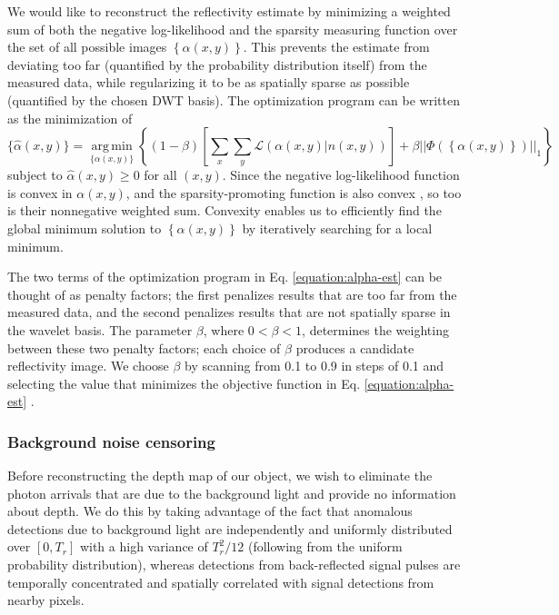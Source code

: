 We would like to reconstruct the reflectivity estimate by minimizing a weighted sum of both the negative log-likelihood and the sparsity measuring function over the set of all possible images $\left\{\alpha(x,y)\right\}$. This prevents the estimate from deviating too far (quantified by the probability distribution itself) from the measured data, while regularizing it to be as spatially sparse as possible (quantified by the chosen DWT basis). The optimization program can be written as the minimization of
\begin{equation}
\{ \hat{\alpha}(x,y) \} = \underset{\{\alpha(x,y)\}}{\operatorname{arg\,min}} \left\{ (1 - \beta) \left[ \sum_x \sum_y \mathcal{L}( \alpha(x,y) | n(x,y) ) \right] + \beta || \Phi\left(\left\{ \alpha(x,y) \right\}\right) ||_1 \right\}
\label{equation:alpha-est}
\end{equation}
subject to $\hat{\alpha}(x,y) \geq 0$ for all $(x,y)$. Since the negative log-likelihood function is convex in $\alpha(x,y)$, and the sparsity-promoting function is also convex \cite{boyd-convex}, so too is their nonnegative weighted sum. Convexity enables us to efficiently find the global minimum solution to $\left\{ \alpha(x,y) \right\}$ by iteratively searching for a local minimum.

The two terms of the optimization program in Eq. \ref{equation:alpha-est} can be thought of as penalty factors; the first penalizes results that are too far from the measured data, and the second penalizes results that are not spatially sparse in the wavelet basis. The parameter $\beta$, where $0 < \beta < 1$, determines the weighting between these two penalty factors; each choice of $\beta$ produces a candidate reflectivity image. We choose $\beta$ by scanning from 0.1 to 0.9 in steps of 0.1 and selecting the value that minimizes the objective function in Eq. \ref{equation:alpha-est} \cite{kirmani-first}.

\subsubsection{Background noise censoring}

Before reconstructing the depth map of our object, we wish to eliminate the photon arrivals that are due to the background light and provide no information about depth. We do this by taking advantage of the fact that anomalous detections due to background light are independently and uniformly distributed over $[0, T_r]$ with a high variance of $T_r^2/12$ (following from the uniform probability distribution), whereas detections from back-reflected signal pulses are temporally concentrated and spatially correlated with signal detections from nearby pixels.

